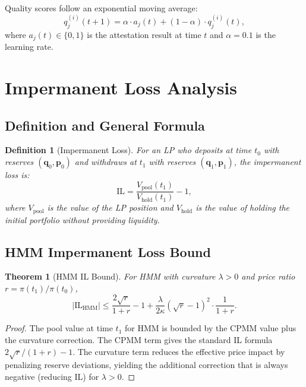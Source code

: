 \documentclass[11pt,twocolumn]{article}
\newtheorem{theorem}{Theorem}
\newtheorem{definition}{Definition}
\begin{document}
Quality scores follow an exponential moving average:
\begin{equation}
q_j^{(i)}(t+1) = \alpha \cdot a_j(t) + (1 - \alpha) \cdot q_j^{(i)}(t),
\end{equation}
where $a_j(t) \in \{0, 1\}$ is the attestation result at time $t$ and $\alpha = 0.1$ is the learning rate.

\section{Impermanent Loss Analysis}
\label{sec:il}

\subsection{Definition and General Formula}

\begin{definition}[Impermanent Loss]
For an LP who deposits at time $t_0$ with reserves $(\bm{q}_0, \bm{p}_0)$ and withdraws at $t_1$ with reserves $(\bm{q}_1, \bm{p}_1)$, the impermanent loss is:
\begin{equation}
\text{IL} = \frac{V_{\text{pool}}(t_1)}{V_{\text{hold}}(t_1)} - 1,
\end{equation}
where $V_{\text{pool}}$ is the value of the LP position and $V_{\text{hold}}$ is the value of holding the initial portfolio without providing liquidity.
\end{definition}

\subsection{HMM Impermanent Loss Bound}

\begin{theorem}[HMM IL Bound]
\label{thm:il}
For HMM with curvature $\lambda > 0$ and price ratio $r = \pi(t_1)/\pi(t_0)$,
\begin{equation}
|\text{IL}_{\text{HMM}}| \le \frac{2\sqrt{r}}{1 + r} - 1 + \frac{\lambda}{2\kappa}(\sqrt{r} - 1)^2 \cdot \frac{1}{1 + r}.
\end{equation}
\end{theorem}

\begin{proof}
The pool value at time $t_1$ for HMM is bounded by the CPMM value plus the curvature correction. The CPMM term gives the standard IL formula $2\sqrt{r}/(1+r) - 1$. The curvature term reduces the effective price impact by penalizing reserve deviations, yielding the additional correction that is always negative (reducing IL) for $\lambda > 0$.
\end{proof}
\end{document}
